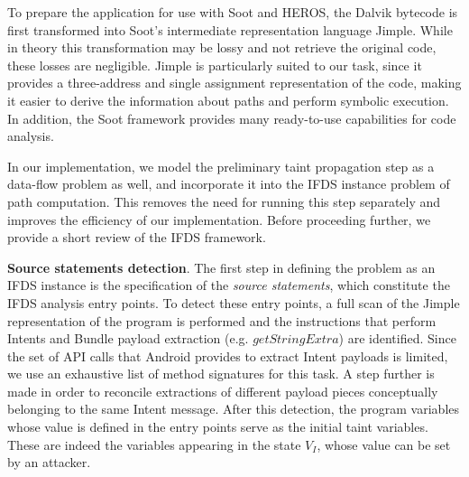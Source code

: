 To prepare the application for use with Soot and HEROS, the Dalvik bytecode is first transformed into Soot's intermediate representation language Jimple. While in theory this transformation may be lossy and not retrieve the original code, these losses are negligible. Jimple is particularly suited to our task, since it provides a three-address and single assignment representation of the code, making it easier to derive the information about paths and perform symbolic execution. In addition, the Soot framework provides many ready-to-use capabilities for code analysis.

In our implementation, we model the preliminary taint propagation step as a data-flow problem as well, and incorporate it into the IFDS instance problem of path computation. This removes the need for running this step separately and improves the efficiency of our implementation. Before proceeding further, we provide a short review of the IFDS framework.



\noindent
\textbf{Source statements detection}.
The first step in defining the problem as an IFDS instance is the specification of the \textit{source statements}, which constitute the IFDS analysis entry points. To detect these entry points, a full scan of the Jimple representation of the program is performed and the instructions that perform Intents and Bundle payload extraction (e.g. $getStringExtra$) are identified. Since the set of API calls that Android provides to extract Intent payloads is limited, we use an exhaustive list of method signatures for this task.
A step further is made in order to reconcile extractions of different payload pieces conceptually belonging
 to the same Intent message. 
 After this detection, the program variables whose value is defined in the entry points serve as the initial taint variables. These are indeed the variables appearing in the state $V_I$, whose value can be set by an attacker.


